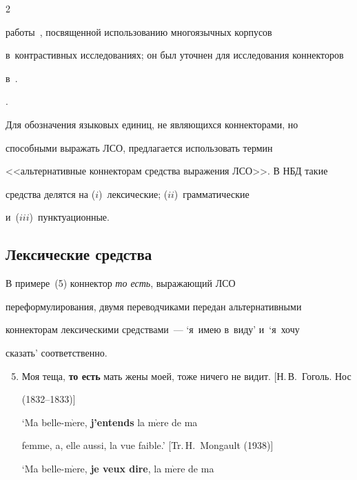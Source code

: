 \begin{multicols}{2}
{работы~\cite{16-in}, посвященной использованию многоязычных корпусов 


в~контрастивных исследованиях; он был уточнен для исследования коннекторов 


в~\cite{17-in}.}.





Для обозначения языковых единиц, не являющихся коннекторами, но 


способными выражать ЛСО, предлагается использовать термин 


<<альтернативные коннекторам средства выражения ЛСО>>. В НБД такие 


средства делятся на ($i$)~лексические; ($ii$)~грамматические 


и~($iii$)~пунктуационные.





\subsection{Лексические средства}





В примере~(5) коннектор \textit{то есть}, выражающий ЛСО 


переформулирования, двумя переводчиками передан альтернативными 


коннекторам лексическими средствами~--- `я~имею в~виду' и~`я~хочу 


сказать' соответственно.


{\small 


\begin{enumerate}[(1)]


\setcounter{enumi}{4}


\item 


 Моя теща, \textbf{то есть} мать жены моей, тоже ничего не видит. [Н.\,В.~Гоголь. Нос 


(1832--1833)]





`Ma belle-m$\grave{\mbox{e}}$re, \textbf{j'entends} la m$\grave{\mbox{e}}$re de ma 


femme, a, elle aussi, la vue faible.' [Tr.\,H.~Mongault (1938)]





`Ma belle-m$\grave{\mbox{e}}$re, \textbf{je veux dire}, la m$\grave{\mbox{e}}$re de ma 



\end{enumerate}}
\end{multicols}
